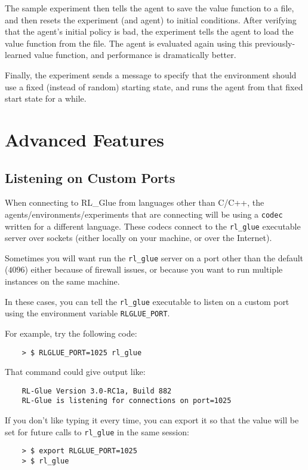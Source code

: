 \documentclass[11pt]{article}
\begin{document}
The sample experiment then tells the agent to save the value function to a file, and then resets the experiment (and agent) to initial conditions.  After verifying that the agent's initial policy is bad, the experiment tells the agent to load the value function from the file.  The agent is evaluated again using this previously-learned value function, and performance is dramatically better.

Finally, the experiment sends a message to specify that the environment should use a fixed (instead of random) starting state, and runs the agent from that fixed start state for a while.

\section{Advanced Features}
\subsection{Listening on Custom Ports}
When connecting to RL\_Glue from languages other than C/C++, the agents/environments/experiments that are connecting will be using a \texttt{codec} written for a different language.  These codecs connect to the \texttt{rl\_glue} executable server over sockets (either locally on your machine, or over the Internet).

Sometimes you will want run the \texttt{rl\_glue} server on a port other than the default
($4096$) either because of firewall issues, or because you want to run multiple instances on the same machine.

In these cases, you can tell the \texttt{rl\_glue} executable to listen on a custom port using the environment variable \texttt{RLGLUE\_PORT}.

For example, try the following code:
\begin{verbatim}
	> $ RLGLUE_PORT=1025 rl_glue
\end{verbatim}

That command could give output like:
\begin{verbatim}
	RL-Glue Version 3.0-RC1a, Build 882
	RL-Glue is listening for connections on port=1025
\end{verbatim}

If you don't like typing it every time, you can export it so that the value will be set for future
calls to \texttt{rl\_glue} in the same session:
\begin{verbatim}
	> $ export RLGLUE_PORT=1025
	> $ rl_glue 
\end{verbatim}
\end{document}
